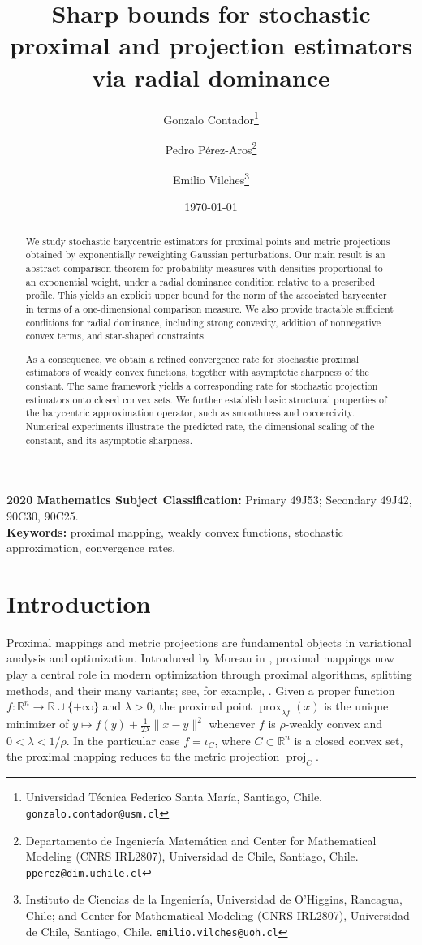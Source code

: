 \documentclass[11pt]{article}
\title{Sharp bounds for stochastic proximal and projection estimators via radial dominance}
\author{%
Gonzalo Contador\thanks{Universidad Técnica Federico Santa María, 
           Santiago, Chile. \texttt{gonzalo.contador@usm.cl}}
\and 
  Pedro P\'erez-Aros\thanks{Departamento de Ingenier\'ia Matem\'atica and Center for Mathematical Modeling (CNRS IRL2807), Universidad de Chile, Santiago, Chile. \texttt{pperez@dim.uchile.cl}}
  \and
  Emilio Vilches\thanks{Instituto de Ciencias de la Ingenier\'ia, Universidad de O'Higgins, Rancagua, Chile; and Center for Mathematical Modeling (CNRS IRL2807), Universidad de Chile, Santiago, Chile. \texttt{emilio.vilches@uoh.cl}}%
}
\date{\today}
\newcommand{\1}{\mathds{1}}
\theoremstyle{definition}
\theoremstyle{remark}
\theoremstyle{definition}
\newcommand{\R}{\mathbb{R}}
\newcommand{\proj}{\operatorname{proj}}
\begin{document}
\maketitle

\begin{abstract}
We study stochastic barycentric estimators for proximal points and metric
projections obtained by exponentially reweighting Gaussian perturbations.
Our main result is an abstract comparison theorem for probability measures
with densities proportional to an exponential weight, under a radial
dominance condition relative to a prescribed profile. This yields an
explicit upper bound for the norm of the associated barycenter in terms of
a one-dimensional comparison measure. We also provide tractable sufficient
conditions for radial dominance, including strong convexity, addition of
nonnegative convex terms, and star-shaped constraints.

As a consequence, we obtain a refined convergence rate for stochastic
proximal estimators of weakly convex functions, together with asymptotic
sharpness of the constant. The same framework yields a corresponding rate
for stochastic projection estimators onto closed convex sets. We further establish basic structural properties of the barycentric
approximation operator, such as smoothness and cocoercivity. Numerical
experiments illustrate the predicted rate, the dimensional
scaling of the constant, and its asymptotic sharpness.
\end{abstract}

\medskip
\noindent\textbf{2020 Mathematics Subject Classification:} Primary 49J53; Secondary 49J42, 90C30, 90C25.\\
\noindent\textbf{Keywords:} proximal mapping, weakly convex functions, stochastic approximation, convergence rates.
\medskip

\section{Introduction}

Proximal mappings and metric projections are fundamental objects in
variational analysis and optimization. Introduced by Moreau in
\cite{MR201952}, proximal mappings now play a central role in modern
optimization through proximal algorithms, splitting methods, and their many
variants; see, for example, \cite{MR3616647}. Given a proper function
\(f\colon \R^n\to \R\cup\{+\infty\}\) and \(\lambda>0\), the proximal point
\(\operatorname{prox}_{\lambda f}(x)\) is the unique minimizer of
\(y\mapsto f(y)+\frac{1}{2\lambda}\|x-y\|^2\) whenever \(f\) is
\(\rho\)-weakly convex and \(0<\lambda<1/\rho\). In the particular case
\(f=\iota_C\), where \(C\subset \R^n\) is a closed convex set, the proximal
mapping reduces to the metric projection \(\proj_C\).
\end{document}
